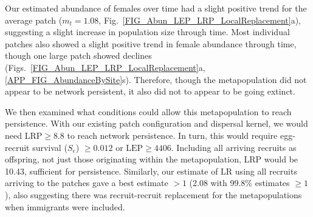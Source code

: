 \documentclass[12pt, oneside]{article}   	%
\begin{document}
Our estimated abundance of females over time had a slight positive trend for the average patch ($m_t = 1.08$, Fig.\ \ref{FIG_Abun_LEP_LRP_LocalReplacement}a), suggesting a slight increase in population size through time. Most individual patches also showed a slight positive trend in female abundance through time, though one large patch showed declines (Figs.\ \ref{FIG_Abun_LEP_LRP_LocalReplacement}a, \ref{APP_FIG_AbundanceBySite}s). Therefore, though the metapopulation did not appear to be network persistent, it also did not to appear to be going extinct. 



We then examined what conditions could allow this metapopulation to reach persistence. With our existing patch configuration and dispersal kernel, we would need $\text{LRP} \geq 8.8$ to reach network persistence. In turn, this would require egg-recruit survival ($S_e$) $\geq 0.012$ or $\text{LEP} \geq 4406$. Including all arriving recruits as offspring, not just those originating within the metapopulation, LRP would be 10.43, sufficient for persistence. Similarly, our estimate of LR using all recruits arriving to the patches gave a best estimate $> 1$ (2.08 with 99.8\% estimates $\geq 1$), also suggesting there was recruit-recruit replacement for the metapopulations when immigrants were included.
 
\end{document}
